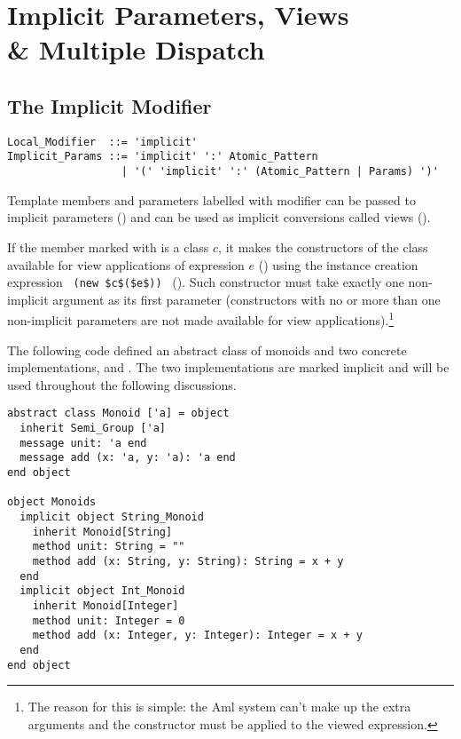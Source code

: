 
\chapter[Implicit Parameters, Views \& Multiple Dispatch]{Implicit Parameters, Views \\\& Multiple Dispatch}
\label{sec:implicit-params-views}
\label{sec:implicits}

\minitoc

\newpage





\section{The Implicit Modifier}
\label{sec:implicit-modifier}

\grammar\begin{lstlisting}
Local_Modifier  ::= 'implicit'
Implicit_Params ::= 'implicit' ':' Atomic_Pattern
                  | '(' 'implicit' ':' (Atomic_Pattern | Params) ')'
\end{lstlisting}

Template members and parameters labelled with  modifier can be passed to implicit parameters () and can be used as implicit conversions called views (). 

If the member marked with  is a class $c$, it makes the constructors of the class available for view applications of expression $e$ () using the instance creation expression ~\lstinline!(new $c$($e$))!~ (). Such constructor must take exactly one non-implicit argument as its first parameter (constructors with no or more than one non-implicit parameters are not made available for view applications).\footnote{The reason for this is simple: the Aml system can't make up the extra arguments and the constructor must be applied to the viewed expression.}

\example\label{ex:impl-monoid} The following code defined an abstract class of monoids and two concrete implementations,  and . The two implementations are marked implicit and will be used throughout the following discussions. 
\begin{lstlisting}
abstract class Monoid ['a] = object
  inherit Semi_Group ['a] 
  message unit: 'a end
  message add (x: 'a, y: 'a): 'a end
end object

object Monoids
  implicit object String_Monoid
    inherit Monoid[String]
    method unit: String = ""
    method add (x: String, y: String): String = x + y
  end
  implicit object Int_Monoid 
    inherit Monoid[Integer] 
    method unit: Integer = 0
    method add (x: Integer, y: Integer): Integer = x + y
  end
end object
\end{lstlisting}






